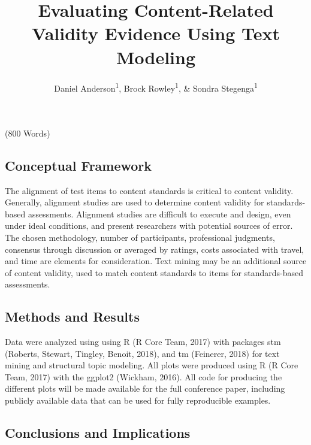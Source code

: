 \documentclass[doc]{apa6}
\title{Evaluating Content-Related Validity Evidence Using Text Modeling}
\author{Daniel Anderson\textsuperscript{1}, Brock Rowley\textsuperscript{1}, \& Sondra Stegenga\textsuperscript{1}}
\affiliation{
    \vspace{0.5cm}
          \textsuperscript{1} University of Oregon  }
\theoremstyle{definition}
\theoremstyle{definition}
\theoremstyle{definition}
\theoremstyle{remark}
\begin{document}
\maketitle

\setcounter{secnumdepth}{0}



(800 Words)

\subsection{Conceptual Framework}\label{conceptual-framework}

The alignment of test items to content standards is critical to content
validity. Generally, alignment studies are used to determine content
validity for standards-based assessments. Alignment studies are
difficult to execute and design, even under ideal conditions, and
present researchers with potential sources of error. The chosen
methodology, number of participants, professional judgments, consensus
through discussion or averaged by ratings, costs associated with travel,
and time are elements for consideration. Text mining may be an
additional source of content validity, used to match content standards
to items for standards-based assessments.

\subsection{Methods and Results}\label{methods-and-results}

Data were analyzed using using R (R Core Team, 2017) with packages stm
(Roberts, Stewart, Tingley, Benoit, 2018), and tm (Feinerer, 2018) for
text mining and structural topic modeling. All plots were produced using
R (R Core Team, 2017) with the ggplot2 (Wickham, 2016). All code for
producing the different plots will be made available for the full
conference paper, including publicly available data that can be used for
fully reproducible examples.

\subsection{Conclusions and
Implications}\label{conclusions-and-implications}
\end{document}
